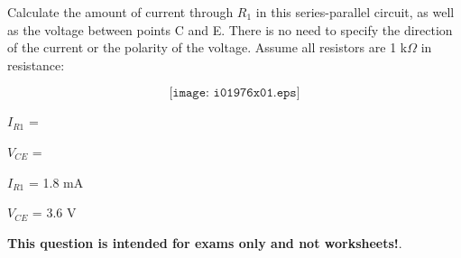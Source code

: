 

Calculate the amount of current through $R_1$ in this series-parallel circuit, as well as the voltage between points C and E.  There is no need to specify the direction of the current or the polarity of the voltage.  Assume all resistors are 1 k$\Omega$ in resistance:

$$\texttt{[image: i01976x01.eps]}$$

$I_{R1}$ = 

\vskip 10pt

$V_{CE}$ = 

\vskip 10pt







$I_{R1}$ = 1.8 mA

\vskip 10pt

$V_{CE}$ = 3.6 V







{\bf This question is intended for exams only and not worksheets!}.


